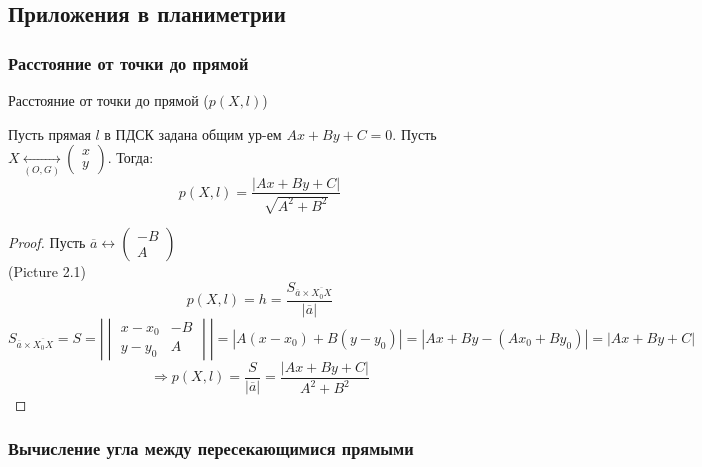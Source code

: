 \subsection{Приложения в планиметрии}

\subsubsection{Расстояние от точки до прямой}

\begin{symb}
Расстояние от точки до прямой ($p(X, l)$)
\end{symb}
\begin{statement}
Пусть прямая $l$ в ПДСК задана общим ур-ем $Ax + By + C = 0$. Пусть $X \underset{(O, G)}{\longleftrightarrow} \begin{pmatrix}x \\ y \end{pmatrix}$. Тогда:
\[
p(X, l) = \frac{\left|Ax + By + C\right|}{\sqrt{A^{2} + B^{2}}}
\]
\end{statement}
\begin{proof}
Пусть $\overline{a} \underset{}{\longleftrightarrow} \begin{pmatrix}-B \\ A \end{pmatrix}$ \\

(Picture 2.1)
\[
p(X, l) = h = \frac{S_{\overline{a} \times \overline{X_0X}}}{\left|\overline{a}\right|}
\]
\[
  S_{\overline{a} \times \overline{X_0X}} = S = \left|\begin{vmatrix}x - x_0 & -B \\ y - y_0 & A \end{vmatrix}\right| = \left|A(x - x_0) + B(y - y_0)\right| = \left|Ax + By - (Ax_0 + By_0)\right| = \left|Ax + By + C\right|
\]
\[
\Rightarrow p(X, l) = \frac{S}{\left|\overline{a}\right|} = \frac{\left|Ax + By + C\right|}{A^{2} + B^{2}}
\]
\end{proof}

\subsubsection{Вычисление угла между пересекающимися прямыми}

